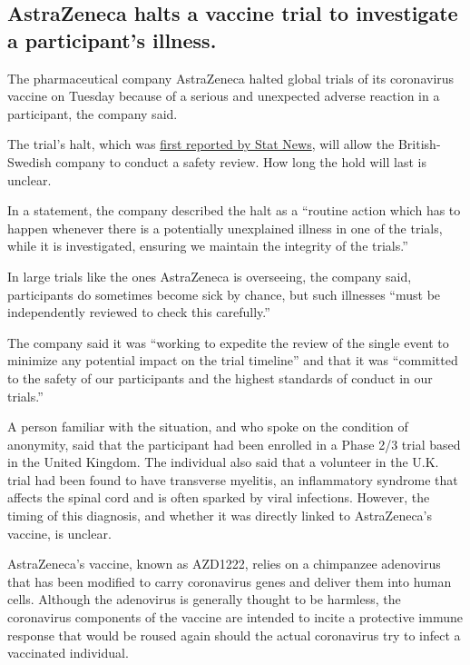 \hypertarget{astrazeneca-halts-a-vaccine-trial-to-investigate-a-participants-illness}{%
\subsection{AstraZeneca halts a vaccine trial to investigate a
participant's
illness.}\label{astrazeneca-halts-a-vaccine-trial-to-investigate-a-participants-illness}}

The pharmaceutical company AstraZeneca halted global trials of its
coronavirus vaccine on Tuesday because of a serious and unexpected
adverse reaction in a participant, the company said.

The trial's halt, which was
\href{https://www.statnews.com/2020/09/08/astrazeneca-covid-19-vaccine-study-put-on-hold-due-to-suspected-adverse-reaction-in-participant-in-the-u-k/}{first
reported by Stat News}, will allow the British-Swedish company to
conduct a safety review. How long the hold will last is unclear.

In a statement, the company described the halt as a ``routine action
which has to happen whenever there is a potentially unexplained illness
in one of the trials, while it is investigated, ensuring we maintain the
integrity of the trials.''

In large trials like the ones AstraZeneca is overseeing, the company
said, participants do sometimes become sick by chance, but such
illnesses ``must be independently reviewed to check this carefully.''

The company said it was ``working to expedite the review of the single
event to minimize any potential impact on the trial timeline'' and that
it was ``committed to the safety of our participants and the highest
standards of conduct in our trials.''

A person familiar with the situation, and who spoke on the condition of
anonymity, said that the participant had been enrolled in a Phase 2/3
trial based in the United Kingdom. The individual also said that a
volunteer in the U.K. trial had been found to have transverse myelitis,
an inflammatory syndrome that affects the spinal cord and is often
sparked by viral infections. However, the timing of this diagnosis, and
whether it was directly linked to AstraZeneca's vaccine, is unclear.

AstraZeneca's vaccine, known as AZD1222, relies on a chimpanzee
adenovirus that has been modified to carry coronavirus genes and deliver
them into human cells. Although the adenovirus is generally thought to
be harmless, the coronavirus components of the vaccine are intended to
incite a protective immune response that would be roused again should
the actual coronavirus try to infect a vaccinated individual.

